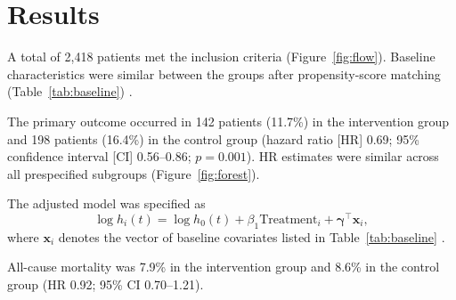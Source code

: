 \section{Results}
\label{sec:results}

A total of 2,418 patients met the inclusion criteria (Figure~\ref{fig:flow}). Baseline characteristics were similar between the groups after propensity-score matching (Table~\ref{tab:baseline}) \cite{austin2011introduction}.

The primary outcome occurred in 142 patients (11.7\%) in the intervention group and 198 patients (16.4\%) in the control group (hazard ratio [HR] 0.69; 95\% confidence interval [CI] 0.56--0.86; $p = 0.001$). HR estimates were similar across all prespecified subgroups (Figure~\ref{fig:forest}).

The adjusted model was specified as
\begin{equation}
  \log h_i(t) = \log h_0(t) + \beta_1 \text{Treatment}_i + \boldsymbol{\gamma}^\top \mathbf{x}_i ,
  \label{eq:cox}
\end{equation}
where $\mathbf{x}_i$ denotes the vector of baseline covariates listed in Table~\ref{tab:baseline} \cite{cox1972regression, therneau2000modeling}.

All-cause mortality was 7.9\% in the intervention group and 8.6\% in the control group (HR 0.92; 95\% CI 0.70--1.21).
